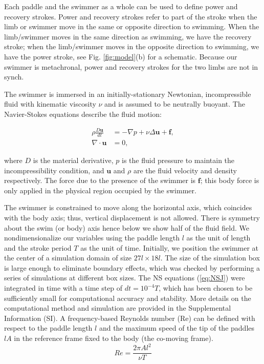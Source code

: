 \documentclass[%
 onecolumn,
superscriptaddress,
 amsmath,amssymb,
 aps,
longbibliography
]{revtex4-2}
\begin{document}
Each paddle and the swimmer as a whole can be used to define power and recovery strokes. Power and recovery strokes refer to part of the stroke when the limb or swimmer move in the same or opposite direction to swimming. When the limb/swimmer moves in the same direction as swimming, we have the recovery stroke; when the limb/swimmer moves in the opposite direction to swimming, we have the power stroke, see Fig. \ref{fig:model}(b) for a schematic. Because our swimmer is metachronal, power and recovery strokes for the two limbs are not in synch. 

The swimmer is immersed in an initially-stationary Newtonian, incompressible fluid with kinematic viscosity $\nu$ and is assumed to be neutrally buoyant. The Navier-Stokes equations describe the fluid motion: 

\begin{equation}
\begin{aligned}
\rho \frac{D\textbf{u}}{dt} &= -\nabla p + \nu \Delta \textbf{u} + \textbf{f}, \\
\nabla \cdot \textbf{u} &= 0,
\end{aligned}
\label{eq:NSJ}
\end{equation}

\noindent where $D$ is the material derivative, $p$ is the fluid pressure to maintain the incompressibility condition, and $\textbf{u}$ and $\rho$ are the fluid velocity and density respectively. The force due to the presence of the swimmer is $\textbf{f}$; this body force is only applied in the physical region occupied by the swimmer. 

The swimmer is constrained to move along the horizontal axis, which coincides with the body axis; thus, vertical displacement is not allowed. There is symmetry about the swim (or body) axis hence below we show half of the fluid field. We nondimensionalize our variables using the paddle length $l$ as the unit of length and the stroke period $T$ as the unit of time. Initially, we position the swimmer at the center of a simulation domain of size $27 l \times 18l$. 
The size of the simulation box is large enough to eliminate boundary effects, which was checked by performing a series of simulations at different box sizes. The NS equations (\ref{eq:NSJ}) were integrated in time with a time step of $dt = 10^{-4} T$, which  has been chosen to be sufficiently small for computational accuracy and stability.  More details on the computational method and simulation are provided in the Supplemental Information (SI).
A frequency-based Reynolds number (Re) can be defined with respect to the paddle length $l$ and the maximum speed of the tip of the paddles $lA$ in the reference frame fixed to the body (the co-moving frame).
\begin{equation}
Re = \frac{2 \pi A l^2}{\nu T}
\label{eq:Re}
\end{equation}
 
\end{document}
